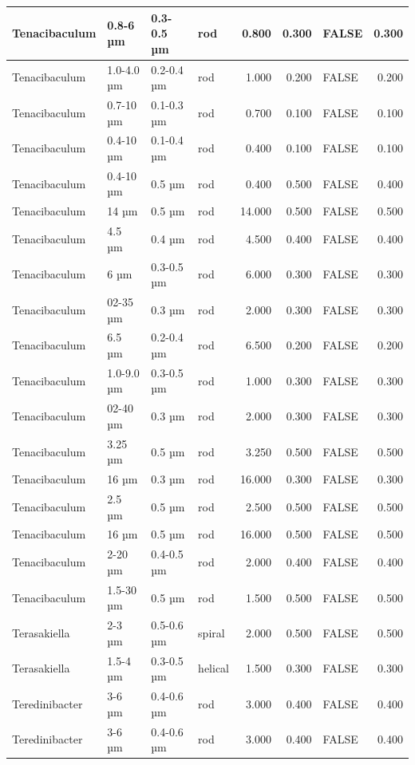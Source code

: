 \documentclass[
]{article}
\begin{document}
\begin{table}
\begin{tabular}{l|l|l|l|r|r|l|r}
\hline
Tenacibaculum & 0.8-6 µm & 0.3-0.5 µm & rod & 0.800 & 0.300 & FALSE & 0.300\\
\hline
Tenacibaculum & 1.0-4.0 µm & 0.2-0.4 µm & rod & 1.000 & 0.200 & FALSE & 0.200\\
\hline
Tenacibaculum & 0.7-10 µm & 0.1-0.3 µm & rod & 0.700 & 0.100 & FALSE & 0.100\\
\hline
Tenacibaculum & 0.4-10 µm & 0.1-0.4 µm & rod & 0.400 & 0.100 & FALSE & 0.100\\
\hline
Tenacibaculum & 0.4-10 µm & 0.5 µm & rod & 0.400 & 0.500 & FALSE & 0.400\\
\hline
Tenacibaculum & 14 µm & 0.5 µm & rod & 14.000 & 0.500 & FALSE & 0.500\\
\hline
Tenacibaculum & 4.5 µm & 0.4 µm & rod & 4.500 & 0.400 & FALSE & 0.400\\
\hline
Tenacibaculum & 6 µm & 0.3-0.5 µm & rod & 6.000 & 0.300 & FALSE & 0.300\\
\hline
Tenacibaculum & 02-35 µm & 0.3 µm & rod & 2.000 & 0.300 & FALSE & 0.300\\
\hline
Tenacibaculum & 6.5 µm & 0.2-0.4 µm & rod & 6.500 & 0.200 & FALSE & 0.200\\
\hline
Tenacibaculum & 1.0-9.0 µm & 0.3-0.5 µm & rod & 1.000 & 0.300 & FALSE & 0.300\\
\hline
Tenacibaculum & 02-40 µm & 0.3 µm & rod & 2.000 & 0.300 & FALSE & 0.300\\
\hline
Tenacibaculum & 3.25 µm & 0.5 µm & rod & 3.250 & 0.500 & FALSE & 0.500\\
\hline
Tenacibaculum & 16 µm & 0.3 µm & rod & 16.000 & 0.300 & FALSE & 0.300\\
\hline
Tenacibaculum & 2.5 µm & 0.5 µm & rod & 2.500 & 0.500 & FALSE & 0.500\\
\hline
Tenacibaculum & 16 µm & 0.5 µm & rod & 16.000 & 0.500 & FALSE & 0.500\\
\hline
Tenacibaculum & 2-20 µm & 0.4-0.5 µm & rod & 2.000 & 0.400 & FALSE & 0.400\\
\hline
Tenacibaculum & 1.5-30 µm & 0.5 µm & rod & 1.500 & 0.500 & FALSE & 0.500\\
\hline
Terasakiella & 2-3 µm & 0.5-0.6 µm & spiral & 2.000 & 0.500 & FALSE & 0.500\\
\hline
Terasakiella & 1.5-4 µm & 0.3-0.5 µm & helical & 1.500 & 0.300 & FALSE & 0.300\\
\hline
Teredinibacter & 3-6 µm & 0.4-0.6 µm & rod & 3.000 & 0.400 & FALSE & 0.400\\
\hline
Teredinibacter & 3-6 µm & 0.4-0.6 µm & rod & 3.000 & 0.400 & FALSE & 0.400\\

\end{tabular}
\end{table}
\end{document}
